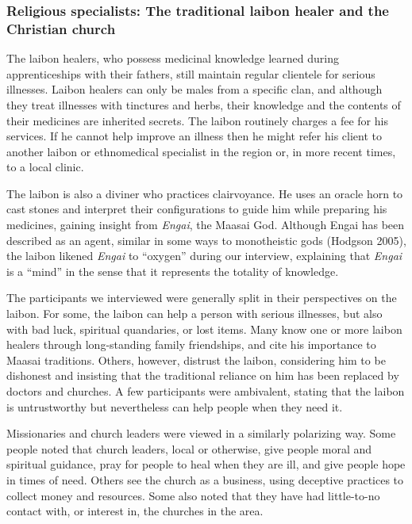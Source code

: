 \documentclass[
  11pt,
]{article}
\begin{document}
\hypertarget{religious-specialists-the-traditional-laibon-healer-and-the-christian-church}{%
\subsubsection{Religious specialists: The traditional laibon healer and the Christian church}\label{religious-specialists-the-traditional-laibon-healer-and-the-christian-church}}

The laibon healers, who possess medicinal knowledge learned during apprenticeships with their fathers, still maintain regular clientele for serious illnesses. Laibon healers can only be males from a specific clan, and although they treat illnesses with tinctures and herbs, their knowledge and the contents of their medicines are inherited secrets. The laibon routinely charges a fee for his services. If he cannot help improve an illness then he might refer his client to another laibon or ethnomedical specialist in the region or, in more recent times, to a local clinic.

The laibon is also a diviner who practices clairvoyance. He uses an oracle horn to cast stones and interpret their configurations to guide him while preparing his medicines, gaining insight from \emph{Engai}, the Maasai God. Although Engai has been described as an agent, similar in some ways to monotheistic gods (Hodgson 2005), the laibon likened \emph{Engai} to ``oxygen'' during our interview, explaining that \emph{Engai} is a ``mind'' in the sense that it represents the totality of knowledge.

The participants we interviewed were generally split in their perspectives on the laibon. For some, the laibon can help a person with serious illnesses, but also with bad luck, spiritual quandaries, or lost items. Many know one or more laibon healers through long-standing family friendships, and cite his importance to Maasai traditions. Others, however, distrust the laibon, considering him to be dishonest and insisting that the traditional reliance on him has been replaced by doctors and churches. A few participants were ambivalent, stating that the laibon is untrustworthy but nevertheless can help people when they need it.

Missionaries and church leaders were viewed in a similarly polarizing way. Some people noted that church leaders, local or otherwise, give people moral and spiritual guidance, pray for people to heal when they are ill, and give people hope in times of need. Others see the church as a business, using deceptive practices to collect money and resources. Some also noted that they have had little-to-no contact with, or interest in, the churches in the area.
\end{document}
